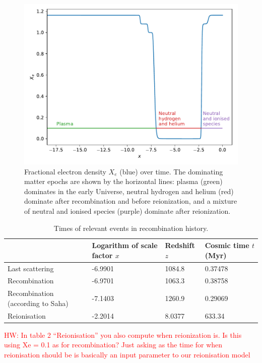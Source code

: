 \documentclass{aa}
\newcommand{\hw}[1]{\textcolor{red}{HW: #1}}
\begin{document}
\begin{figure}[ht]
    \centering
    \includegraphics[width=\hsize]{report/figures/Xe-reion.pdf}
    \caption{Fractional electron density $X_e$ (blue) over time. The dominating matter epochs are shown by the horizontal lines: plasma (green) dominates in the early Universe, neutral hydrogen and helium (red) dominate after recombination and before reionization, and a mixture of neutral and ionised species (purple) dominate after reionization.}
    \label{fig:Xe-reion}
\end{figure}

\begin{table}[ht]
\caption{Times of relevant events in recombination history.}             
\label{table:times-rec}      
\centering          
\begin{tabular}{l l l l}     %
\hline\hline       
& Logarithm of scale factor $x$      & Redshift $z$     & Cosmic time $t$ (Myr)\\ 
\hline                    
Last scattering   & -6.9901  & 1084.8  & 0.37478 \\
Recombination & -6.9701 & 1063.3 & 0.38758                 \\
Recombination (according to Saha) & -7.1403 & 1260.9 & 0.29069\\
Reionisation & -2.2014 & 8.0377 & 633.34\\
\hline                  
\end{tabular}
\end{table}

\hw{In table 2 “Reionisation” you also compute when reionization is. Is this using Xe = 0.1 as for recombination? Just asking as the time for when reionisation should be is basically an input parameter to our reionisation model}
\end{document}
